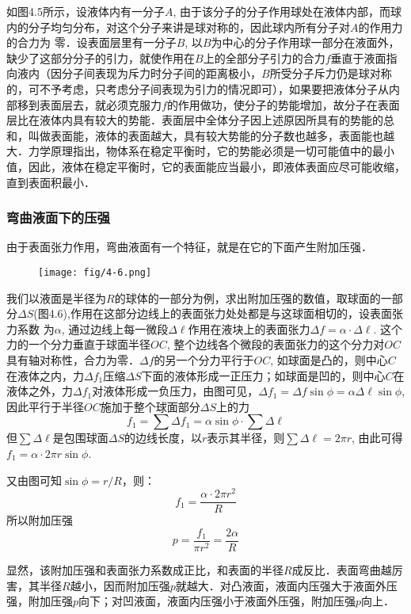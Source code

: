 如图4.5所示，设液体内有一分子$A$, 由于该分子的分子作用球处在液体内部，而球内的分子均匀分布，对这个分子来讲是球对称的，因此球内所有分子对$A$的作用力的合力为
零．设表面层里有一分子$B$, 以$B$为中心的分子作用球一部分在液面外，缺少了这部分分子的引力，就使作用在$B$上的全部分子引力的合力$f$垂直于液面指向液内（因分子间表现为斥力时分子间的距离极小，$B$所受分子斥力仍是球对称的，可不予考虑，只考虑分子间表现为引力的情况即可），如果要把液体分子从内部移到表面层去，就必须克服力$f$的作用做功，使分子的势能增加，故分子在表面层比在液体内具有较大的势能．表面层中全体分子因上述原因所具有的势能的总和，叫做表面能，液体的表面越大，具有较大势能的分子数也越多，表面能也越大．力学原理指出，物体系在稳定平衡时，它的势能必须是一切可能值中的最小值，因此，液体在稳定平衡时，它的表面能应当最小，即液体表面应尽可能收缩，直到表面积最小．

\subsubsection{弯曲液面下的压强}

由于表面张力作用，弯曲液面有一个特征，就是在它的下面产生附加压强．
\begin{figure}[htp]
    \centering
\texttt{[image: fig/4-6.png]}
    \caption{}
\end{figure}

我们以液面是半径为$R$的球体的一部分为例，求出附加压强的数值，取球面的一部分$\Delta S$(图4.6),作用在这部分边线上的表面张力处处都是与这球面相切的，设表面张力系数
为$\alpha$, 通过边线上每一微段$\Delta\ell$作用在液块上的表面张力$\Delta f=\alpha\cdot \Delta\ell$. 这个力的一个分力垂直于球面半径$OC$, 整个边线各个微段的表面张力的这个分力对$OC$具有轴对称性，合力为零．$\Delta f$的另一个分力平行于$OC$, 如球面是凸的，则中心$C$在液体之内，力$\Delta f_1$压缩$\Delta S$下面的液体形成一正压力；如球面是凹的，则中心$C$在液体之外，力$\Delta f_1$对液体形成一负压力，由图可见，$\Delta f_1=\Delta f\sin\phi=\alpha\Delta \ell\sin\phi$, 因此平行于半径$OC$施加于整个球面部分$\Delta S$上的力
\[f_1=\sum \Delta f_1=\alpha\sin\phi\cdot \sum \Delta \ell\]
但$\sum \Delta \ell$是包围球面$\Delta S$的边线长度，以$r$表示其半径，则$\sum \Delta \ell=2\pi r$, 由此可得 $f_1=\alpha\cdot 2\pi r\sin\phi$.

又由图可知$\sin\phi=r/R$，则：
\[f_1=\frac{\alpha\cdot 2\pi r^2}{R}\]
所以附加压强
\[p=\frac{f_1}{\pi r^2}=\frac{2\alpha}{R}\]

显然，该附加压强和表面张力系数成正比，和表面的半径$R$成反比．表面弯曲越厉害，其半径$R$越小，因而附加压强$p$就越大．对凸液面，液面内压强大于液面外压强，附加压强$p$向下；对凹液面，液面内压强小于液面外压强，附加压强$p$向上．

